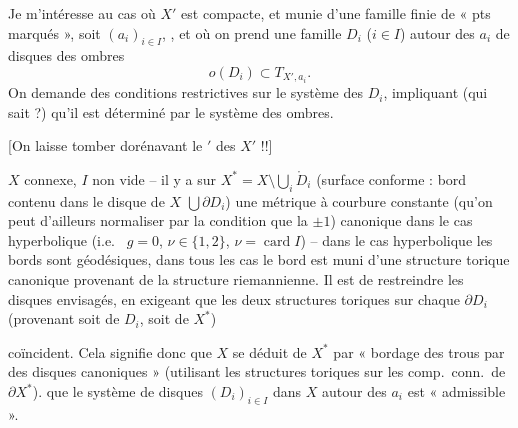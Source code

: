 \documentclass[11pt,a4paper]{article}
\begin{document}
Je m'intéresse  au cas où $X'$ est compacte, et munie d'une
famille finie de « pts marqués », soit $(a_i)_{i \in I}$, , et
où on prend une famille  $D_i$
($i \in I$) autour des $a_i$ de disques  des ombres
\[
  o(D_i) \subset T_{X',a_i} .
\]
On demande des conditions restrictives  sur le
système des $D_i$, impliquant (qui sait ?) qu'il est déterminé par le
système des ombres.


[On laisse tomber dorénavant le $'$ des $X'$ !!]

\struck{\ill{}}  $X$ connexe, $I$ non vide --  il y a sur $X^{*} = X \setminus \bigcup_i \mathring{D}_i$
(surface conforme : bord contenu dans le disque de $X$ \ill{}
$\bigcup \partial D_i$) une \struck{\ill{}} métrique
  à courbure constante (qu'on peut d'ailleurs
normaliser par la condition que la  
$\pm 1$)   canonique dans le cas
hyperbolique (i.e.\  $g = 0$,
$\nu \in \{1, 2\}$, $\nu = \operatorname{card} I$) -- dans le cas
hyperbolique les bords sont géodésiques, dans tous les cas le bord est muni
d'une structure torique canonique provenant de la structure riemannienne.
Il est  de restreindre les  disques
envisagés, en exigeant que les deux structures toriques sur
\struck{\ill{}} chaque $\partial D_i$ (provenant soit de $D_i$, soit de
$X^{*}$)


coïncident. Cela signifie donc que $X$ se déduit de $X^{*}$ par « bordage
des trous par des disques canoniques » (utilisant les structures toriques
sur les comp.\ conn.\ de $\partial X^{*}$). 
 \struck{\ill{}} que le système de disques
$(D_i)_{i \in I}$ dans $X$ autour des $a_i$ est « admissible ».
\end{document}
